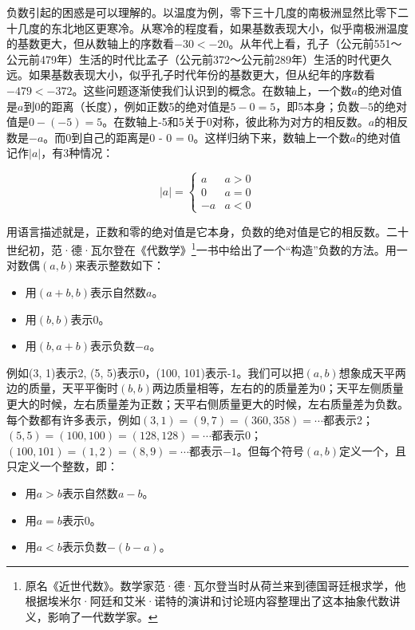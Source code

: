 \documentclass[b5paper]{ctexart}
\begin{document}
负数引起的困惑是可以理解的。以温度为例，零下三十几度的南极洲显然比零下二十几度的东北地区更寒冷。从寒冷的程度看，如果基数表现大小，似乎南极洲温度的基数更大，但从数轴上的序数看$-30 < -20$。从年代上看，孔子（公元前551～公元前479年）生活的时代比孟子（公元前372～公元前289年）生活的时代更久远。如果基数表现大小，似乎孔子时代年份的基数更大，但从纪年的序数看$-479 < -372$。这些问题逐渐使我们认识到的概念。在数轴上，一个数$a$的绝对值是$a$到0的距离（长度），例如正数5的绝对值是$5 - 0 = 5$，即5本身；负数$-5$的绝对值是$0 - (-5) = 5$。在数轴上-5和5关于0对称，彼此称为对方的相反数。$a$的相反数是$-a$。而0到自己的距离是0 - 0 = 0。这样归纳下来，数轴上一个数$a$的绝对值记作$|a|$，有3种情况：

\[
|a| = \begin{cases}
  a & a > 0 \\
  0 & a = 0 \\
  -a & a < 0
\end{cases}
\]

  \label{sec:z-as-pair}
用语言描述就是，正数和零的绝对值是它本身，负数的绝对值是它的相反数。二十世纪初，范·德·瓦尔登在《代数学》\footnote{原名《近世代数》。数学家范·德·瓦尔登当时从荷兰来到德国哥廷根求学，他根据埃米尔·阿廷和艾米·诺特的演讲和讨论班内容整理出了这本抽象代数讲义，影响了一代数学家。}一书中给出了一个“构造”负数的方法。用一对数偶$(a, b)$来表示整数如下：
\begin{itemize}
\item 用$(a + b, b)$表示自然数$a$。
\item 用$(b, b)$表示0。
\item 用$(b, a + b)$表示负数$-a$。
\end{itemize}

例如(3, 1)表示2, (5, 5)表示0，(100, 101)表示-1。我们可以把$(a, b)$想象成天平两边的质量，天平平衡时$(b, b)$两边质量相等，左右的的质量差为0；天平左侧质量更大的时候，左右质量差为正数；天平右侧质量更大的时候，左右质量差为负数。每个数都有许多表示，例如$(3, 1) = (9, 7) = (360, 358) = \cdots$都表示2；$(5, 5) = (100, 100) = (128, 128) = \cdots$都表示0；$(100, 101) = (1, 2) = (8, 9) = \cdots$都表示$-1$。但每个符号$(a, b)$定义一个，且只定义一个整数，即：

\begin{itemize}
\item 用$a > b$表示自然数$a - b$。
\item 用$a = b$表示0。
\item 用$a < b$表示负数$-(b - a)$。
\end{itemize}
\end{document}
